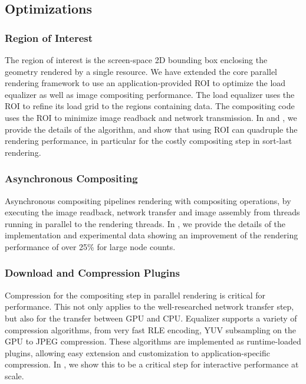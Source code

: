 \documentclass[10pt,journal,compsoc]{IEEEtran}
\begin{document}
\subsection{Optimizations}

\subsubsection{Region of Interest}

The region of interest is the screen-space 2D bounding box enclosing the
geometry rendered by a single resource. We have extended the core parallel
rendering framework to use an application-provided ROI to optimize the load
equalizer as well as image compositing performance. The load equalizer uses the
ROI to refine its load grid to the regions containing data. The compositing code
uses the ROI to minimize image readback and network transmission. In
\cite{MEP:10} and \cite{EBAHMP:12}, we provide the details of the algorithm, and
show that using ROI can quadruple the rendering performance, in particular for
the costly compositing step in sort-last rendering.

\subsubsection{Asynchronous Compositing}

Asynchronous compositing pipelines rendering with compositing operations, by
executing the image readback, network transfer and image assembly from threads
running in parallel to the rendering threads. In \cite{EBAHMP:12}, we provide
the details of the implementation and experimental data showing an improvement
of the rendering performance of over 25\% for large node counts.

\subsubsection{Download and Compression Plugins}

Compression for the compositing step in parallel rendering is critical for
performance. This not only applies to the well-researched network transfer step,
but also for the transfer between GPU and CPU. \textsf{Equalizer} supports a
variety of
compression algorithms, from very fast RLE encoding, YUV
subsampling on the GPU to JPEG compression. These algorithms are implemented as
runtime-loaded
plugins, allowing easy extension and customization to application-specific
compression. In \cite{MEP:10}, we show this to be a critical step for
interactive performance at scale.
\end{document}
